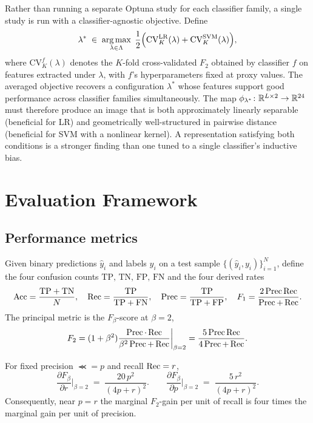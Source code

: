 \begin{remark}
\label{rem:agnostic-search}
Rather than running a separate Optuna study for each classifier family, a single
study is run with a classifier-agnostic objective.
Define
\[
  \lambda^* \;\in\; \operatorname*{arg\,max}_{\lambda\in\Lambda}\;
  \frac{1}{2}\Bigl(
    \mathrm{CV}_K^{\mathrm{LR}}(\lambda) +
    \mathrm{CV}_K^{\mathrm{SVM}}(\lambda)
  \Bigr),
\]
where $\mathrm{CV}_K^f(\lambda)$ denotes the $K$-fold cross-validated $F_2$ obtained
by classifier $f$ on features extracted under $\lambda$, with $f$'s hyperparameters
fixed at proxy values.
The averaged objective recovers a configuration $\lambda^*$ whose features support
good performance across classifier families simultaneously.
The map $\phi_{\lambda^*}\colon\mathbb{R}^{L\times 2}\to\mathbb{R}^{24}$ must therefore produce an
image that is both approximately linearly separable (beneficial for LR) and
geometrically well-structured in pairwise distance (beneficial for SVM with a
nonlinear kernel).
A representation satisfying both conditions is a stronger finding than one tuned
to a single classifier's inductive bias.
\end{remark}

\section{Evaluation Framework}
\label{subsec:eval_framework}

\subsection{Performance metrics}
\label{subsubsec:metric}

Given binary predictions $\widehat y_i$ and labels $y_i$ on a test sample $\{(\widehat y_i,y_i)\}_{i=1}^N$, define the four confusion counts $\mathrm{TP},\,\mathrm{TN},\,\mathrm{FP},\,\mathrm{FN}$ and the four derived rates
\[
  \operatorname{Acc}=\frac{\mathrm{TP}+\mathrm{TN}}{N},
  \quad
  \operatorname{Rec}=\frac{\mathrm{TP}}{\mathrm{TP}+\mathrm{FN}},
  \quad
  \operatorname{Prec}=\frac{\mathrm{TP}}{\mathrm{TP}+\mathrm{FP}},
  \quad
  F_1=\frac{2\operatorname{Prec}\operatorname{Rec}}{\operatorname{Prec}+\operatorname{Rec}}.
\]
The principal metric is the $F_\beta$-score at $\beta=2$,
\begin{equation}
  F_2=(1+\beta^2)\frac{\operatorname{Prec}\cdot\operatorname{Rec}}{\beta^2\operatorname{Prec}+\operatorname{Rec}}\bigg|_{\beta=2}=\frac{5\operatorname{Prec}\operatorname{Rec}}{4\operatorname{Prec}+\operatorname{Rec}}.
  \label{eq:F2}
\end{equation}

\begin{proposition}
\label{prop:F2-recall-weight}
For fixed precision $\Prec=p$ and recall $\operatorname{Rec}=r$,
\[
  \frac{\partial F_\beta}{\partial r}\bigg|_{\beta=2}\;=\;\frac{20\,p^2}{(4p+r)^2}.
  \qquad
  \frac{\partial F_\beta}{\partial p}\bigg|_{\beta=2}\;=\;\frac{5\,r^2}{(4p+r)^2}.
\]
Consequently, near $p=r$ the marginal $F_2$-gain per unit of recall is four times the marginal gain per unit of precision.
\end{proposition}


